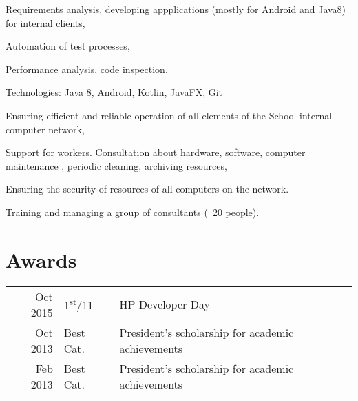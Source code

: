 \documentclass[]{deedy-resume-openfont}
\begin{document}
\begin{minipage}[t]{0.66\textwidth}
\begin{tightemize}
\item Requirements analysis, developing appplications (mostly for Android and Java8) for internal clients,
\item Automation of test processes,
\item Performance analysis, code inspection.
\end{tightemize}
Technologies: Java 8, Android, Kotlin, JavaFX, Git
\sectionsep

\begin{tightemize}
\item Ensuring efficient and reliable operation of all elements of the School internal computer network,
\item Support for workers. Consultation about hardware, software, computer maintenance , periodic cleaning, archiving resources, 
\item Ensuring the security of resources of all computers on the network.
\end{tightemize}
\sectionsep

\begin{tightemize}
\item Training and managing a group of consultants (~20 people).\end{tightemize}
\sectionsep


 \section{Awards} 
 \begin{tabular}{rll}
 Oct 2015	     & 1\textsuperscript{st}/11  & HP Developer Day\\
 Oct 2013	     & Best Cat.  & President’s scholarship for academic achievements \\
 Feb 2013	     & Best Cat.  & President’s scholarship for academic achievements \\
 \end{tabular}
 \sectionsep

\end{minipage} 
\end{document}
